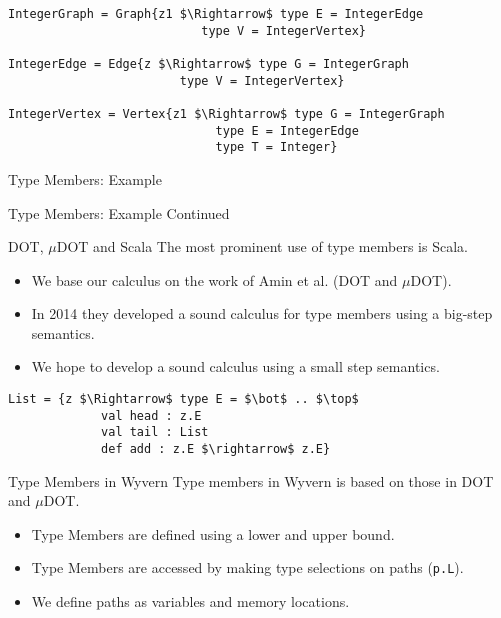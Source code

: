 \documentclass[dvipsnames]{beamer}
\begin{document}
\begin{lrbox}{\tmExAcont}
\begin{lstlisting}[mathescape, style=customlang]		      
IntegerGraph = Graph{z1 $\Rightarrow$ type E = IntegerEdge
                           type V = IntegerVertex}
		
IntegerEdge = Edge{z $\Rightarrow$ type G = IntegerGraph
                        type V = IntegerVertex}
		
IntegerVertex = Vertex{z1 $\Rightarrow$ type G = IntegerGraph
                             type E = IntegerEdge
                             type T = Integer}
\end{lstlisting}
\end{lrbox}

\begin{frame}{Type Members: Example}
\begin{example}
\usebox{\tmExA}
\end{example}
\end{frame}

\begin{frame}{Type Members: Example Continued}
\begin{example}
\usebox{\tmExAcont}
\end{example}
\end{frame}


\begin{frame}{DOT, $\mu$DOT and Scala}
The most prominent use of type members is Scala. 
\begin{itemize}
\item
We base our calculus on the work of Amin et al. (DOT and $\mu$DOT).
\item
In 2014 they developed a sound calculus for type members using a big-step semantics.
\item
We hope to develop a sound calculus using a small step semantics.
\end{itemize}
\end{frame}

\begin{lrbox}{\tmExWyvern}
\begin{lstlisting}[mathescape, style=customlang]	
List = {z $\Rightarrow$ type E = $\bot$ .. $\top$
             val head : z.E
             val tail : List
             def add : z.E $\rightarrow$ z.E}
\end{lstlisting}
\end{lrbox}

\begin{frame}{Type Members in Wyvern}
Type members in Wyvern is based on those in DOT and $\mu$DOT. 
\begin{itemize}
\item
Type Members are defined using a lower and upper bound.
\item
Type Members are accessed by making type selections on paths (\texttt{p.L}).
\item
We define paths as variables and memory locations.
\end{itemize}
\begin{example}
\usebox{\tmExWyvern}
\end{example}
\end{frame}
\end{document}
